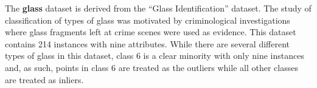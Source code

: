 The \textbf{glass} dataset is derived from the ``Glass Identification'' dataset.
The study of classification of types of glass was motivated by criminological investigations where glass fragments left at crime scenes were used as evidence.
This dataset contains 214 instances with nine attributes.
While there are several different types of glass in this dataset, class 6 is a clear minority with only nine instances and, as such, points in class 6 are treated as the outliers while all other classes are treated as inliers.

%
%
%
%
%
%
%
%
%
%
